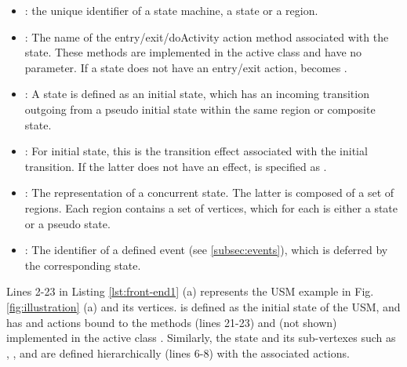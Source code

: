 \noindent
{}
\begin{itemize}[\footnotesize]
	\item {}: the unique identifier of a state machine, a state or a region.
	
	\item {}: The name of the entry/exit/doActivity action method associated with the state. 
	These methods are implemented in the active class and have no parameter.
	If a state does not have an entry/exit action,  becomes .
	
	\item {}: A state is defined as an initial state, which has an incoming transition outgoing from a pseudo initial state within the same region or composite state. 
	
	\item {}: For initial state, this is the transition effect associated with the initial transition.
	If the latter does not have an effect,  is specified as .
	
	\item {}: The representation of a concurrent state. 
	The latter is composed of a set of regions.
	Each region contains a set of vertices, which for each is either a state or a pseudo state.
	
	\item {}: The identifier of a defined event (see \ref{subsec:events}), which is deferred by the corresponding state. 
\end{itemize}

\noindent
{}
Lines 2-23 in Listing \ref{lst:front-end1} (a) represents the USM example in Fig. \ref{fig:illustration} (a) and its vertices.
 is defined as the initial state of the USM, and has  and  actions bound to the methods  (lines 21-23) and  (not shown) implemented in the active class .
Similarly, the state  and its sub-vertexes such as , , and  are defined hierarchically (lines 6-8) with the associated actions.

